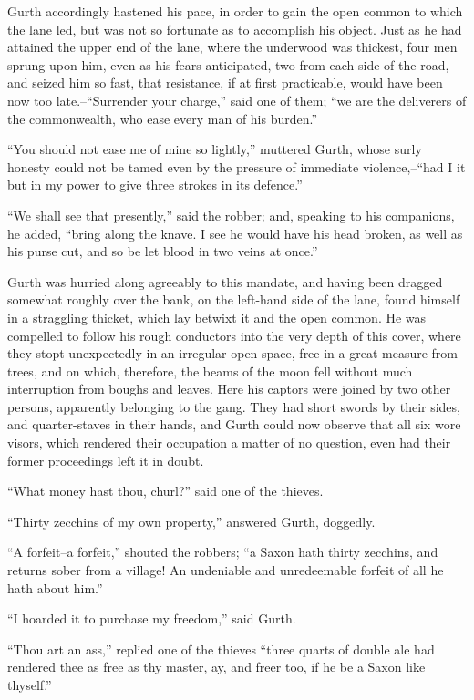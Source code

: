 Gurth accordingly hastened his pace, in order to gain the open common to
which the lane led, but was not so fortunate as to accomplish his
object. Just as he had attained the upper end of the lane, where the
underwood was thickest, four men sprung upon him, even as his fears
anticipated, two from each side of the road, and seized him so fast,
that resistance, if at first practicable, would have been now too
late.--``Surrender your charge,'' said one of them; ``we are the
deliverers of the commonwealth, who ease every man of his burden.''

``You should not ease me of mine so lightly,'' muttered Gurth, whose
surly honesty could not be tamed even by the pressure of immediate
violence,--``had I it but in my power to give three strokes in its
defence.''

``We shall see that presently,'' said the robber; and, speaking to his
companions, he added, ``bring along the knave. I see he would have his
head broken, as well as his purse cut, and so be let blood in two veins
at once.''

Gurth was hurried along agreeably to this mandate, and having been
dragged somewhat roughly over the bank, on the left-hand side of the
lane, found himself in a straggling thicket, which lay betwixt it and
the open common. He was compelled to follow his rough conductors into
the very depth of this cover, where they stopt unexpectedly in an
irregular open space, free in a great measure from trees, and on which,
therefore, the beams of the moon fell without much interruption from
boughs and leaves. Here his captors were joined by two other persons,
apparently belonging to the gang. They had short swords by their sides,
and quarter-staves in their hands, and Gurth could now observe that all
six wore visors, which rendered their occupation a matter of no
question, even had their former proceedings left it in doubt.

``What money hast thou, churl?'' said one of the thieves.

``Thirty zecchins of my own property,'' answered Gurth, doggedly.

``A forfeit--a forfeit,'' shouted the robbers; ``a Saxon hath thirty
zecchins, and returns sober from a village! An undeniable and
unredeemable forfeit of all he hath about him.''

``I hoarded it to purchase my freedom,'' said Gurth.

``Thou art an ass,'' replied one of the thieves ``three quarts of double
ale had rendered thee as free as thy master, ay, and freer too, if he be
a Saxon like thyself.''

